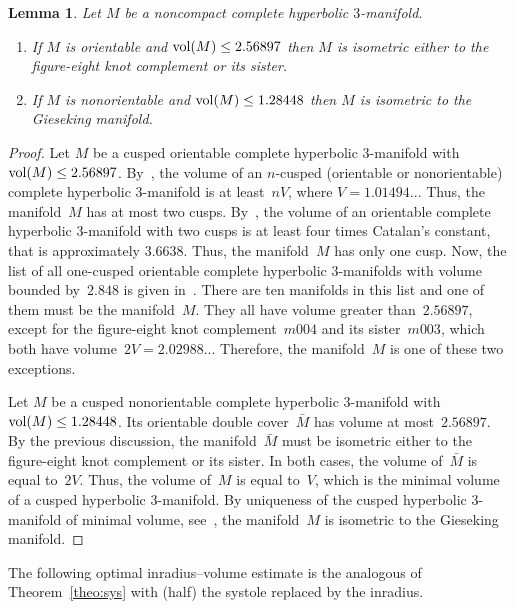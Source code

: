 \documentclass[11pt,reqno]{amsart}
\newtheorem{lemma}[theorem]{Lemma}
\theoremstyle{definition}
\numberwithin{equation}{section}
\DeclareMathOperator{\vol}{{\rm vol}}
\numberwithin{equation}{section}
\begin{document}
\forget
\begin{lemma}
Let $M$ be a noncompact complete hyperbolic $3$-manifold.
\begin{enumerate}
\item If $M$ is orientable and $\vol(M) \leq 2.56897$ then $M$ is isometric either to the figure-eight knot complement or its sister.
\item If $M$ is nonorientable and $\vol(M) \leq 1.28448$ then $M$ is isometric to the Gieseking manifold.
\end{enumerate}
\end{lemma}
\forgotten

\begin{proof}
Let $M$ be a cusped orientable complete hyperbolic $3$-manifold with $\vol(M) \leq 2.56897$.
%
By~\cite{adams_cusps}, the volume of an $n$-cusped (orientable or nonorientable) complete hyperbolic $3$-manifold is at least~$n V$, where $V = 1.01494...$
Thus, the manifold~$M$ has at most two cusps.
%
By~\cite{agol_2cusps}, the volume of an orientable complete hyperbolic $3$-manifold with two cusps is at least four times Catalan's constant, that is approximately $3.6638$.
Thus, the manifold~$M$ has only one cusp.
%
Now, the list of all one-cusped orientable complete hyperbolic $3$-manifolds with volume bounded by~$2.848$ is given in~\cite{GMM}.
There are ten manifolds in this list and one of them must be the manifold~$M$.
They all have volume greater than~$2.56897$, except for the figure-eight knot complement~$m004$ and its sister~$m003$, which both have volume~$2V = 2.02988...$
Therefore, the manifold~$M$ is one of these two exceptions.

\medskip

Let $M$ be a cusped nonorientable complete hyperbolic $3$-manifold with $\vol(M) \leq 1.28448$.
Its orientable double cover~$\bar{M}$ has volume at most~$2.56897$.
By the previous discussion, the manifold~$\bar{M}$ must be isometric either to the figure-eight knot complement or its sister.
In both cases, the volume of~$\bar{M}$ is equal to~$2V$.
Thus, the volume of~$M$ is equal to~$V$, which is the minimal volume of a cusped hyperbolic $3$-manifold.
By uniqueness of the cusped hyperbolic $3$-manifold of minimal volume, see~\cite{adams_minvol}, the manifold~$M$ is isometric to the Gieseking manifold.
\end{proof}

The following optimal inradius--volume  estimate is the analogous of Theorem~\ref{theo:sys} with (half) the systole replaced by the inradius.
\end{document}
